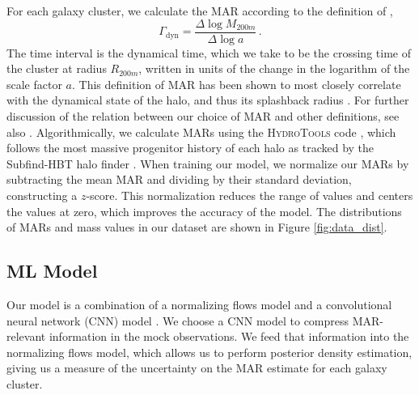 For each galaxy cluster, we calculate the MAR according to the definition of \cite{Diemer_2020},
\begin{equation}\label{eqn:MAR_def}
    \Gamma_{\mathrm{dyn}} = \frac{\Delta \log M_{200m}}{\Delta \log a} \,.
\end{equation}
The time interval is the dynamical time, which we take to be the crossing time of the cluster at radius $R_{200m}$, written in units of the change in the logarithm of the scale factor $a$. This definition of MAR has been shown to most closely correlate with the dynamical state of the halo, and thus its splashback radius \cite{Shin_2023}. For further discussion of the relation between our choice of MAR and other definitions, see also \cite{Valles_Perez_2020}. Algorithmically, we calculate MARs using the \textsc{HydroTools} code \cite{diemer_17_sfh, diemer_18_hih2}, which follows the most massive progenitor history of each halo as tracked by the Subfind-HBT halo finder \cite{Springel_2021}. When training our model, we normalize our MARs by subtracting the mean MAR and dividing by their standard deviation, constructing a $z$-score. This normalization reduces the range of values and centers the values at zero, which improves the accuracy of the model. The distributions of MARs and mass values in our dataset are shown in Figure \ref{fig:data_dist}. 

\subsection{ML Model}\label{Ch4_models}
Our model is a combination of a normalizing flows model \cite[see][for a review of normalizing flows]{Papamakarios_2019} and a convolutional neural network (CNN) model \cite[see][for a review of CNN and deep learning]{LeCun_2015}. We choose a CNN model to compress MAR-relevant information in the mock observations. We feed that information into the normalizing flows model, which allows us to perform posterior density estimation, giving us a measure of the uncertainty on the MAR estimate for each galaxy cluster. 

